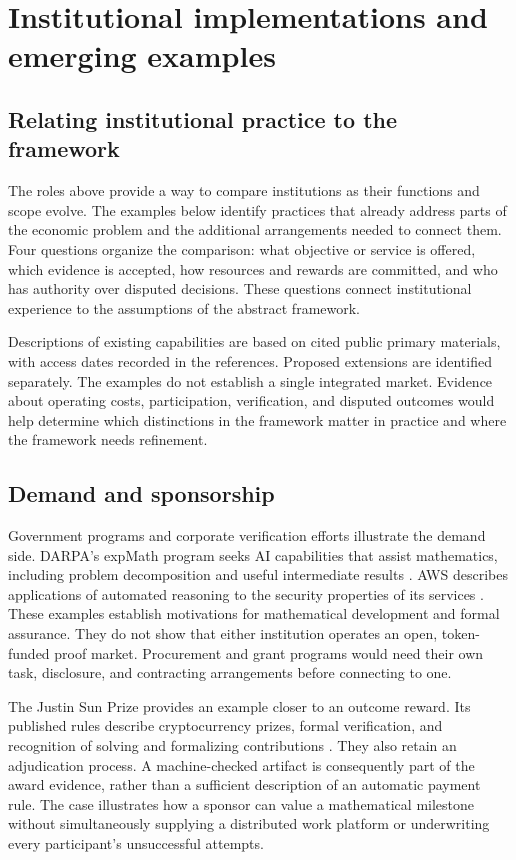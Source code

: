 \documentclass[11pt,a4paper]{article}
\begin{document}
\section{Institutional implementations and emerging examples}
\label{sec:implementations}
\subsection{Relating institutional practice to the framework}
The roles above provide a way to compare institutions as their functions and scope evolve. The examples below identify practices that already address parts of the economic problem and the additional arrangements needed to connect them. Four questions organize the comparison: what objective or service is offered, which evidence is accepted, how resources and rewards are committed, and who has authority over disputed decisions. These questions connect institutional experience to the assumptions of the abstract framework.

Descriptions of existing capabilities are based on cited public primary materials, with access dates recorded in the references. Proposed extensions are identified separately. The examples do not establish a single integrated market. Evidence about operating costs, participation, verification, and disputed outcomes would help determine which distinctions in the framework matter in practice and where the framework needs refinement.

\subsection{Demand and sponsorship}
Government programs and corporate verification efforts illustrate the demand side. DARPA's expMath program seeks AI capabilities that assist mathematics, including problem decomposition and useful intermediate results \citep{darpa}. AWS describes applications of automated reasoning to the security properties of its services \citep{aws}. These examples establish motivations for mathematical development and formal assurance. They do not show that either institution operates an open, token-funded proof market. Procurement and grant programs would need their own task, disclosure, and contracting arrangements before connecting to one.

The Justin Sun Prize provides an example closer to an outcome reward. Its published rules describe cryptocurrency prizes, formal verification, and recognition of solving and formalizing contributions \citep{sun}. They also retain an adjudication process. A machine-checked artifact is consequently part of the award evidence, rather than a sufficient description of an automatic payment rule. The case illustrates how a sponsor can value a mathematical milestone without simultaneously supplying a distributed work platform or underwriting every participant's unsuccessful attempts.
\end{document}
